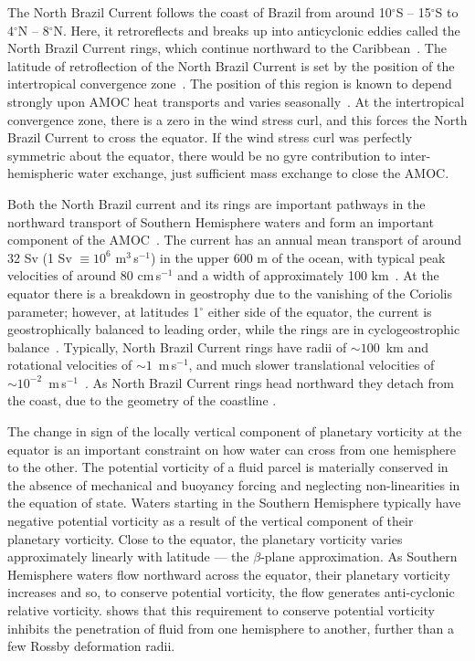 The North Brazil Current follows the coast of Brazil from around 10$^\circ$S -- 15$^\circ$S to 4$^\circ$N -- 8$^\circ$N. Here, it retroreflects and breaks up into anticyclonic eddies called the North Brazil Current rings, which continue northward to the Caribbean~\citep{Bourles1999, Garzoli2003, Fratantoni2006, Talley2011AtlOce}. The latitude of retroflection of the North Brazil Current is set by the position of the intertropical convergence zone~\citep{Fonseca2004}. The position of this region is known to depend strongly upon AMOC heat transports and varies seasonally~\citep{Zhang2005, Fuckar2013}. At the intertropical convergence zone, there is a zero in the wind stress curl, and this forces the North Brazil Current to cross the equator. If the wind stress curl was perfectly symmetric about the equator, there would be no gyre contribution to inter-hemispheric water exchange, just sufficient mass exchange to close the AMOC.

Both the North Brazil current and its rings are important pathways in the northward transport of Southern Hemisphere waters and form an important component of the AMOC~\citep{Zhang2011, Bower2019}. The current has an annual mean transport of around 32 Sv (1 Sv $\equiv 10^{6}$ m$^3$\,s$^{-1}$) in the upper 600 m of the ocean, with typical peak velocities of around 80 cm\,s$^{-1}$ and a width of approximately 100 km~\citep{Schott1993, Johns1998, Barnier2001}. At the equator there is a breakdown in geostrophy due to the vanishing of the Coriolis parameter; however, at latitudes 1$^\circ$ either side of the equator, the current is geostrophically balanced to leading order, while the rings are in cyclogeostrophic balance~\citep{Vianna2003, Castelao2011}. Typically, North Brazil Current rings have radii of $\sim 100$~km and rotational velocities of $\sim 1$~m\,s$^{-1}$, and much slower translational velocities of $\sim 10^{-2}$~m\,s$^{-1}$~\citep{Castelao2011}. As North Brazil Current rings head northward they detach from the coast, due to the geometry of the coastline \citep{Nof1996b, Nof1996, Zharkov2010, Deremble2017}.

The change in sign of the locally vertical component of planetary vorticity at the equator is an important constraint on how water can cross from one hemisphere to the other. The potential vorticity of a fluid parcel is materially conserved in the absence of mechanical and buoyancy forcing and neglecting non-linearities in the equation of state. Waters starting in the Southern Hemisphere typically have negative potential vorticity as a result of the vertical component of their planetary vorticity. Close to the equator, the planetary vorticity varies approximately linearly with latitude --- the $\beta$-plane approximation. As Southern Hemisphere waters flow northward across the equator, their planetary vorticity increases and so, to conserve potential vorticity, the flow generates anti-cyclonic relative vorticity. \citet{Killworth1991} shows that this requirement to conserve potential vorticity inhibits the penetration of fluid from one hemisphere to another, further than a few Rossby deformation radii.

